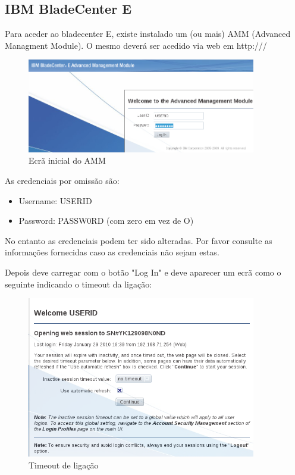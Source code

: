\subsection{IBM BladeCenter E}

Para aceder ao bladecenter E, existe instalado um (ou mais) AMM (Advanced Managment Module). O mesmo deverá ser acedido via web em http://\bladecenterip{}/

\begin{figure}[H]
    \begin{center}
        \includegraphics[width=10cm]{include/img/amm_bladecenterE_1}
    \end{center}
    \caption{Ecrã inicial do AMM}
    \label{fig:amm-1}
\end{figure}

As credenciais por omissão são:
\begin{itemize}
\item Username: USERID
\item Password: PASSW0RD   (com zero em vez de O)
\end{itemize}

No entanto as credenciais podem ter sido alteradas. Por favor consulte as informações fornecidas caso as credenciais não sejam estas.

Depois deve carregar com o botão "Log In" e deve aparecer um ecrã como o seguinte indicando o timeout da ligação:

\begin{figure}[H]
    \begin{center}
        \includegraphics[width=10cm]{include/img/amm_bladecenterE_2}
    \end{center}
    \caption{Timeout de ligação}
    \label{fig:amm-2}
\end{figure}

